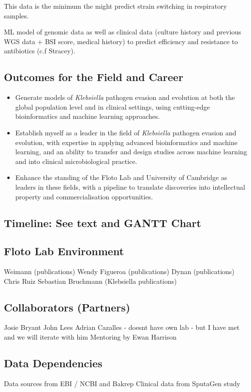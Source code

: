 \documentclass{article}
\begin{document}
This data is the minimum the might predict strain switching in respiratory samples.

ML model of genomic data as well as clinical data (culture history and previous WGS data + BSI score, medical history) 
to predict efficiency and resistance to antibiotics (c.f Stracey). 




\subsection*{Outcomes for the Field and Career}
\begin{itemize}
  \item Generate models of \textit{Klebsiella} pathogen evasion and evolution at 
  both the global population level and in clinical settings, using cutting-edge bioinformatics 
  and machine learning approaches.
  \item Establish myself as a leader in the field of \textit{Klebsiella} pathogen evasion
  and evolution, with expertise in applying advanced bioinformatics and machine learning, 
  and an ability to transfer and design studies across machine learning and into clinical microbiological practice.
  \item Enhance the standing of the Floto Lab and University of Cambridge as leaders in 
  these fields, with a pipeline to translate discoveries into intellectual property and commercialisation opportunities.
\end{itemize}


\subsection*{Timeline:  See text and GANTT Chart}

\subsection*{Floto Lab Environment}
Weimann (publications)
Wendy Figueroa (publications)
Dynan (publications)
Chris Ruiz
Sebastian Bruchmann (Klebsiella publications)

\subsection*{Collaborators (Partners)}
Josie Bryant
John Lees
Adrian Cazalles - doesnt have own lab - but I have met and we will iterate with him
Mentoring by Ewan Harrison

\subsection*{Data Dependencies}
Data sources from EBI / NCBI and Bakrep
Clinical data from SputaGen study
\end{document}
